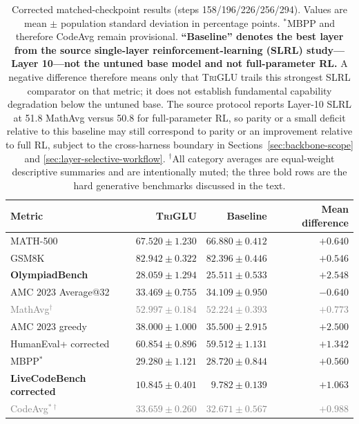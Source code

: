\documentclass[10pt]{article}
\newcommand{\TriGLU}{\textsc{TriGLU}}
\begin{document}
\begin{table}[H]
\centering
\caption{Corrected matched-checkpoint results (steps 158/196/226/256/294).
Values are mean $\pm$ population standard deviation in percentage points.
$^*$MBPP and therefore CodeAvg remain provisional.
\protect\newline
\textbf{``Baseline'' denotes the best layer from the source single-layer
reinforcement-learning (SLRL) study---Layer 10---not the untuned base model and
not full-parameter RL.}
A negative difference therefore means only that \TriGLU{} trails this strongest
SLRL comparator on that metric; it does not establish fundamental capability
degradation below the untuned base.  The source protocol reports Layer-10 SLRL
at 51.8 MathAvg versus 50.8 for full-parameter RL, so parity or a small deficit
relative to this baseline may still correspond to parity or an improvement
relative to full RL, subject to the cross-harness boundary in
Sections~\ref{sec:backbone-scope} and \ref{sec:layer-selective-workflow}.
\protect\newline
$^\dagger$All category averages are equal-weight descriptive summaries and are
intentionally muted; the three bold rows are the hard generative benchmarks
discussed in the text.}
\label{tab:means}
\small
\begin{tabular}{lrrr}
\toprule
Metric & \TriGLU{} & Baseline & Mean difference \\
\midrule
MATH-500 & $67.520\pm1.230$ & $66.880\pm0.412$ & $+0.640$ \\
GSM8K & $82.942\pm0.322$ & $82.396\pm0.446$ & $+0.546$ \\
\textbf{OlympiadBench} & $\mathbf{28.059\pm1.294}$ & $\mathbf{25.511\pm0.533}$ & $\mathbf{+2.548}$ \\
AMC 2023 Average@32 & $33.469\pm0.755$ & $34.109\pm0.950$ & $-0.640$ \\
\textcolor{gray}{MathAvg$^\dagger$} & \textcolor{gray}{$52.997\pm0.184$} & \textcolor{gray}{$52.224\pm0.393$} & \textcolor{gray}{$+0.773$} \\
AMC 2023 greedy & $38.000\pm1.000$ & $35.500\pm2.915$ & $+2.500$ \\
\midrule
HumanEval+ corrected & $60.854\pm0.896$ & $59.512\pm1.131$ & $+1.342$ \\
MBPP$^*$ & $29.280\pm1.121$ & $28.720\pm0.844$ & $+0.560$ \\
\textbf{LiveCodeBench corrected} & $\mathbf{10.845\pm0.401}$ & $\mathbf{9.782\pm0.139}$ & $\mathbf{+1.063}$ \\
\textcolor{gray}{CodeAvg$^{*\dagger}$} & \textcolor{gray}{$33.659\pm0.260$} & \textcolor{gray}{$32.671\pm0.567$} & \textcolor{gray}{$+0.988$} \\

\end{tabular}
\end{table}
\end{document}
